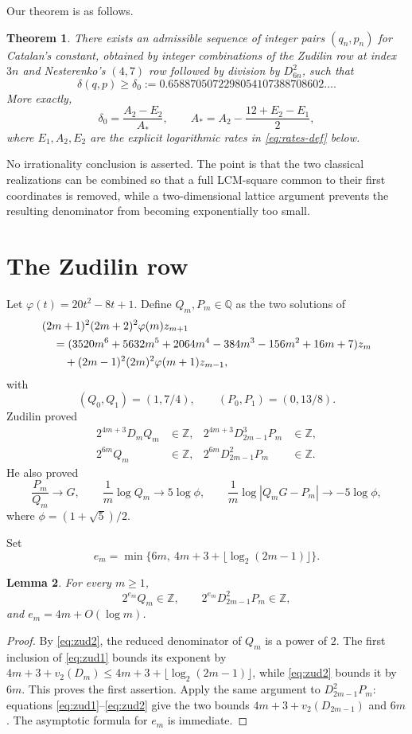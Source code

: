 \documentclass[11pt]{article}
\newtheorem{theorem}{Theorem}[section]
\newtheorem{lemma}[theorem]{Lemma}
\theoremstyle{definition}
\theoremstyle{remark}
\newcommand{\Z}{\mathbb Z}
\newcommand{\Q}{\mathbb Q}
\begin{document}
Our theorem is as follows.

\begin{theorem}\label{thm:main}
There exists an admissible sequence of integer pairs $(q_n,p_n)$ for Catalan's constant, obtained by integer combinations of the Zudilin row at index $3n$ and Nesterenko's $(4,7)$ row followed by division by $D_{6n}^2$, such that
\[
\boxed{
\delta(q,p)\ge \delta_0
:=0.6588705072298054107388708602\ldots .}
\]
More exactly,
\[
\delta_0=\frac{A_2-E_2}{A_*},\qquad
A_*=A_2-\frac{12+E_2-E_1}{2},
\]
where $E_1,A_2,E_2$ are the explicit logarithmic rates in \eqref{eq:rates-def} below.
\end{theorem}

No irrationality conclusion is asserted.  The point is that the two classical realizations can be combined so that a full LCM-square common to their first coordinates is removed, while a two-dimensional lattice argument prevents the resulting denominator from becoming exponentially too small.

\section{The Zudilin row}
Let $\varphi(t)=20t^2-8t+1$.  Define $Q_m,P_m\in\Q$ as the two solutions of
\begin{align}
&(2m+1)^2(2m+2)^2\varphi(m)z_{m+1}\notag\\
&\quad=(3520m^6+5632m^5+2064m^4-384m^3-156m^2+16m+7)z_m\notag\\
&\qquad +(2m-1)^2(2m)^2\varphi(m+1)z_{m-1},\label{eq:zrec}
\end{align}
with
\[
(Q_0,Q_1)=(1,7/4),\qquad (P_0,P_1)=(0,13/8).
\]
Zudilin proved \cite{Zudilin2003,Zudilin2002}
\begin{align}
2^{4m+3}D_mQ_m&\in\Z,&
2^{4m+3}D_{2m-1}^3P_m&\in\Z,\label{eq:zud1}\\
2^{6m}Q_m&\in\Z,&
2^{6m}D_{2m-1}^2P_m&\in\Z.\label{eq:zud2}
\end{align}
He also proved
\begin{equation}\label{eq:zrawrates}
\frac{P_m}{Q_m}\to G,\qquad
\frac1m\log Q_m\to5\log\phi,\qquad
\frac1m\log|Q_mG-P_m|\to-5\log\phi,
\end{equation}
where $\phi=(1+\sqrt5)/2$.

Set
\[
e_m=\min\{6m,\ 4m+3+\lfloor\log_2(2m-1)\rfloor\}.
\]

\begin{lemma}\label{lem:zint}
For every $m\ge1$,
\[
2^{e_m}Q_m\in\Z,\qquad
2^{e_m}D_{2m-1}^2P_m\in\Z,
\]
and $e_m=4m+O(\log m)$.
\end{lemma}
\begin{proof}
By \eqref{eq:zud2}, the reduced denominator of $Q_m$ is a power of $2$.  The first inclusion of \eqref{eq:zud1} bounds its exponent by
$4m+3+v_2(D_m)\le4m+3+\lfloor\log_2(2m-1)\rfloor$, while \eqref{eq:zud2} bounds it by $6m$.  This proves the first assertion.  Apply the same argument to $D_{2m-1}^2P_m$: equations \eqref{eq:zud1}--\eqref{eq:zud2} give the two bounds
$4m+3+v_2(D_{2m-1})$ and $6m$.  The asymptotic formula for $e_m$ is immediate.
\end{proof}
\end{document}
